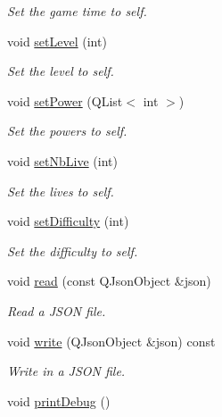 \begin{DoxyCompactItemize}
\begin{DoxyCompactList}\small\item\em Set the game time to self. \end{DoxyCompactList}\item 
\hypertarget{class_g___profil_aaa48e2c6674de2a920cb1e70de0fb35c}{}void \hyperlink{class_g___profil_aaa48e2c6674de2a920cb1e70de0fb35c}{set\+Level} (int)\label{class_g___profil_aaa48e2c6674de2a920cb1e70de0fb35c}

\begin{DoxyCompactList}\small\item\em Set the level to self. \end{DoxyCompactList}\item 
\hypertarget{class_g___profil_a6aed1451a6542a47820316417eaa6985}{}void \hyperlink{class_g___profil_a6aed1451a6542a47820316417eaa6985}{set\+Power} (Q\+List$<$ int $>$)\label{class_g___profil_a6aed1451a6542a47820316417eaa6985}

\begin{DoxyCompactList}\small\item\em Set the powers to self. \end{DoxyCompactList}\item 
\hypertarget{class_g___profil_ac5441b4c5889b20f9b42d939b2705a62}{}void \hyperlink{class_g___profil_ac5441b4c5889b20f9b42d939b2705a62}{set\+Nb\+Live} (int)\label{class_g___profil_ac5441b4c5889b20f9b42d939b2705a62}

\begin{DoxyCompactList}\small\item\em Set the lives to self. \end{DoxyCompactList}\item 
\hypertarget{class_g___profil_aa99217bf145355b87f1881ab77c6dd61}{}void \hyperlink{class_g___profil_aa99217bf145355b87f1881ab77c6dd61}{set\+Difficulty} (int)\label{class_g___profil_aa99217bf145355b87f1881ab77c6dd61}

\begin{DoxyCompactList}\small\item\em Set the difficulty to self. \end{DoxyCompactList}\item 
void \hyperlink{class_g___profil_ab7b2ac7efaf060381e7bcd180d15b720}{read} (const Q\+Json\+Object \&json)
\begin{DoxyCompactList}\small\item\em Read a J\+S\+O\+N file. \end{DoxyCompactList}\item 
void \hyperlink{class_g___profil_ac17e86caabd7f5b40eebfba8ff4feec1}{write} (Q\+Json\+Object \&json) const 
\begin{DoxyCompactList}\small\item\em Write in a J\+S\+O\+N file. \end{DoxyCompactList}\item 
\hypertarget{class_g___profil_a2aeb5b3ab3c922f702d18db02ff0f52f}{}void \hyperlink{class_g___profil_a2aeb5b3ab3c922f702d18db02ff0f52f}{print\+Debug} ()\label{class_g___profil_a2aeb5b3ab3c922f702d18db02ff0f52f}


\end{DoxyCompactItemize}
